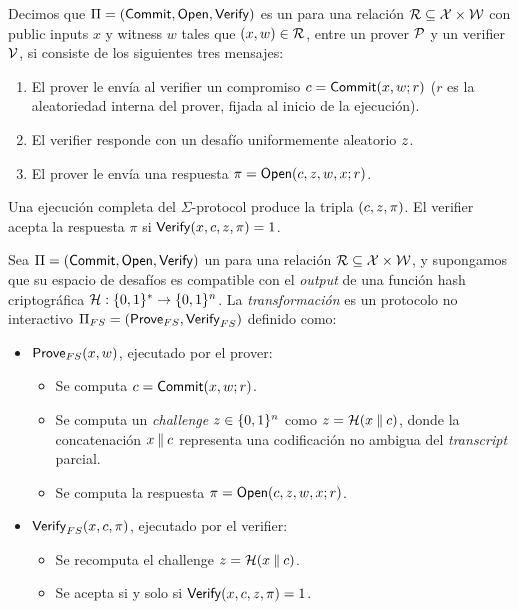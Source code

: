 \begin{definition}[\SigmaProtocol]
\label{def:apendice-b-fiat-shamir-sigmaprotocol}
	Decimos que $\Pi = (\mathsf{Commit}, \mathsf{Open}, \mathsf{Verify})$ es un \SigmaProtocol para una relación $\mathcal{R} \subseteq \mathcal{X} \times \mathcal{W}$ con public inputs $x$ y witness $w$ tales que $(x,w) \in \mathcal{R}$, entre un prover $\mathcal{P}$ y un verifier $\mathcal{V}$, si consiste de los siguientes tres mensajes:
	\begin{enumerate}[itemsep=0.1 cm]
		\item El prover le envía al verifier un compromiso $c = \mathsf{Commit}(x, w; r)$ ($r$ es la aleatoriedad interna del prover, fijada al inicio de la ejecución).
		\item El verifier responde con un desafío uniformemente aleatorio $z$.
		\item El prover le envía una respuesta $\pi = \mathsf{Open}(c, z, w, x; r)$.
	\end{enumerate}
	Una ejecución completa del $\Sigma$-protocol produce la tripla $(c, z, \pi)$. El verifier acepta la respuesta $\pi$ si $\mathsf{Verify}(x, c, z, \pi) = 1$.
\end{definition}

\begin{definition}
\label{def:apendice-b-fiat-shamir-transformacion-fiatshamir}
	Sea $\Pi = (\mathsf{Commit}, \mathsf{Open}, \mathsf{Verify})$ un \SigmaProtocol para una relación $\mathcal{R} \subseteq \mathcal{X} \times \mathcal{W}$, y supongamos que su espacio de desafíos es compatible con el \textit{output} de una función hash criptográfica $\mathcal{H}: \{0,1\}^{*} \to \{0,1\}^{n}$. La \emph{transformación \FiatShamir} es un protocolo no interactivo $\Pi_{FS} = (\mathsf{Prove}_{FS}, \mathsf{Verify}_{FS})$ definido como:
	\begin{itemize}[noitemsep]
		\item $\mathsf{Prove}_{FS}(x,w)$, ejecutado por el prover:
		\begin{itemize}[noitemsep]
			\item Se computa $c = \mathsf{Commit}(x,w;r)$.
			\item Se computa un \textit{challenge} $z \in \{0,1\}^{n}$ como $z = \mathcal{H}(x \mathbin{\|} c)$, donde la concatenación $x \mathbin{\|} c$ representa una codificación no ambigua del \textit{transcript} parcial.
			\item Se computa la respuesta $\pi = \mathsf{Open}(c, z, w, x; r)$.
		\end{itemize}
		\item $\mathsf{Verify}_{FS}(x,c,\pi)$, ejecutado por el verifier:
		\begin{itemize}[noitemsep]
			\item Se recomputa el challenge $z = \mathcal{H}(x \mathbin{\|} c)$.
			\item Se acepta si y solo si $\mathsf{Verify}(x,c,z,\pi) = 1$.
		\end{itemize}
	\end{itemize}
\end{definition}

